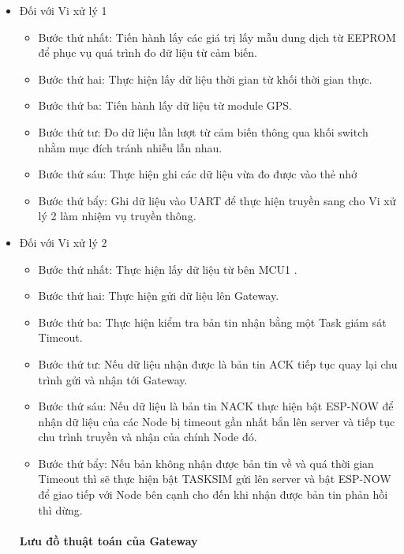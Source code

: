\documentclass{article} %
\begin{document}
	
	\begin{itemize}
		\item Đối với Vi xử lý 1
		\begin{itemize}[label=$\ast$]
			\item Bước thứ nhất: Tiến hành lấy các giá trị lấy mẫu dung dịch từ EEPROM để phục vụ quá trình đo dữ liệu từ cảm biến.
			\item Bước thứ hai: Thực hiện lấy dữ liệu thời gian từ khối thời gian thực.
			\item Bước thứ ba: Tiến hành lấy dữ liệu từ module GPS.
			\item Bước thứ tư: Đo dữ liệu lần lượt từ cảm biến thông qua khối switch nhằm mục đích tránh nhiễu lẫn nhau.
			\item Bước thứ sáu: Thực hiện ghi các dữ liệu vừa đo được vào thẻ nhớ
			\item Bước thứ bẩy: Ghi dữ liệu vào UART để thực hiện truyền sang cho Vi xử lý 2 làm nhiệm vụ truyền thông.
		\end{itemize}

		\item Đối với Vi xử lý 2
		\begin{itemize}[label=$\ast$]
			\item Bước thứ nhất: Thực hiện lấy dữ liệu từ bên MCU1 .
			\item Bước thứ hai: Thực hiện gửi dữ liệu lên Gateway.
			\item Bước thứ ba: Thực hiện kiểm tra bản tin nhận bằng một Task giám sát Timeout.
			\item Bước thứ tư: Nếu dữ liệu nhận được là bản tin ACK tiếp tục quay lại chu trình gửi và nhận tới Gateway.
			\item Bước thứ sáu: Nếu dữ liệu là bản tin NACK thực hiện bật ESP-NOW để nhận dữ liệu của các Node bị timeout gần nhất bắn lên server và tiếp tục chu trình truyền và nhận của chính Node đó.
			\item Bước thứ bẩy: Nếu bản không nhận được bản tin về và quá thời gian Timeout thì sẽ thực hiện bật TASKSIM gửi lên server và bật ESP-NOW để giao tiếp với Node bên cạnh cho đến khi nhận được bản tin phản hồi thì dừng.
		\end{itemize}
		\paragraph{Lưu đồ thuật toán của Gateway}\mbox{}
		

\end{itemize}
\end{document}
